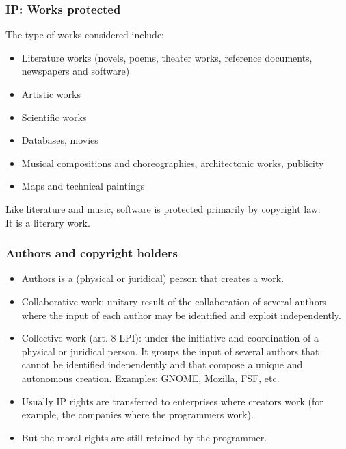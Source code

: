 \documentclass{beamer}
\begin{document}

\begin{frame}
\frametitle{IP: Works protected}

The type of works considered include:

\begin{itemize}
\item Literature works (novels, poems, theater works, reference documents, newspapers and software)
\item Artistic works 
\item Scientific works 
\item Databases, movies 
\item Musical compositions and choreographies, architectonic works, publicity 
\item Maps and technical paintings
\end{itemize}

\begin{center}
\footnotesize
Like literature and music, \alert{software} is protected primarily by copyright law: \\ It is a \alert{literary work}.
\end{center}

\end{frame}



\begin{frame}
\frametitle{Authors and copyright holders}

\begin{itemize}

\item Authors is a (physical or juridical) person that creates
a work. 

\item \alert{Collaborative work}: unitary result of the collaboration
of several authors where the input of each author may be
identified and exploit independently.
\item \alert{Collective work} (art. 8 LPI): under the initiative and coordination of
a physical or juridical person. It groups the input
of several authors that cannot be identified independently
and that compose a unique and autonomous creation. {\footnotesize Examples: GNOME,
Mozilla, FSF, etc.}
\item Usually IP rights are transferred to enterprises where creators
work (for example, the companies where the programmers work). 
\item But the moral rights are still retained by the programmer.


\end{itemize}

\end{frame}
\end{document}
